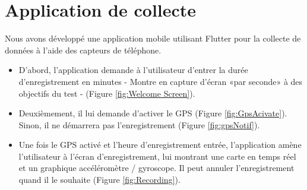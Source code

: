 \section{Application de collecte}
\label{sec:app_record}
Nous avons développé une application mobile utilisant Flutter pour la collecte de données à l'aide des capteurs de téléphone.
\begin{itemize}
    \item D'abord, l'application demande à l'utilisateur d'entrer la durée d'enregistrement en minutes - Montre en capture d'écran «par seconde» à des objectifs du test - (Figure \ref{fig:Welcome Screen}).
          
    \item Deuxièmement, il lui demande d'activer le GPS (Figure \ref{fig:GpsAcivate}). Sinon, il ne démarrera pas l'enregistrement (Figure \ref{fig:gpsNotif}).



    \item Une fois le GPS activé et l'heure d'enregistrement entrée, l'application amène l'utilisateur à l'écran d'enregistrement, lui montrant une carte en temps réel et un graphique accéléromètre / gyroscope. Il peut annuler l'enregistrement quand il le souhaite (Figure \ref{fig:Recording}).


\end{itemize}
